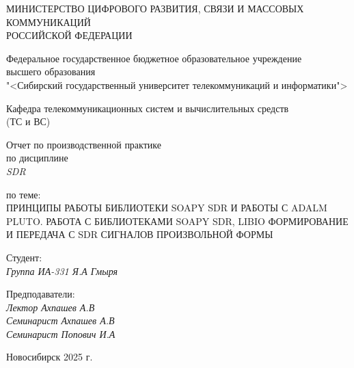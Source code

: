 \thispagestyle{empty}

\begin{center}
    МИНИСТЕРСТВО ЦИФРОВОГО РАЗВИТИЯ, СВЯЗИ И МАССОВЫХ КОММУНИКАЦИЙ \\ РОССИЙСКОЙ ФЕДЕРАЦИИ

    \vspace{20pt}

    Федеральное государственное бюджетное образовательное учреждение  \\  высшего образования \\
    "<Сибирский государственный университет телекоммуникаций и информатики"> \\

    \vspace{20pt}

    Кафедра телекоммуникационных систем и вычислительных средств \\  (ТС и ВС)
\end{center}

\vfill

\begin{center}
    Отчет по производственной практике \\  
    по дисциплине \\
    \textit{SDR}

    \vspace{20pt}
    по теме: \\
    \uppercase{Принципы работы библиотеки Soapy SDR и работы с Adalm Pluto. Работа с библиотеками Soapy SDR, Libio  
    Формирование и передача с SDR сигналов произвольной формы}
\end{center}

\vfill

    \noindent Студент: \\
    \textit{Группа ИА-331 \hfill Я.А Гмыря}

    \vspace{20pt}

    \noindent Предподаватели: \\
    \textit{Лектор \hfill Ахпашев А.В} \\
    \textit{Семинарист \hfill Ахпашев А.В} \\
    \textit{Семинарист \hfill Попович И.А}

\vfill

\begin{center}
    Новосибирск 2025 г.
\end{center}